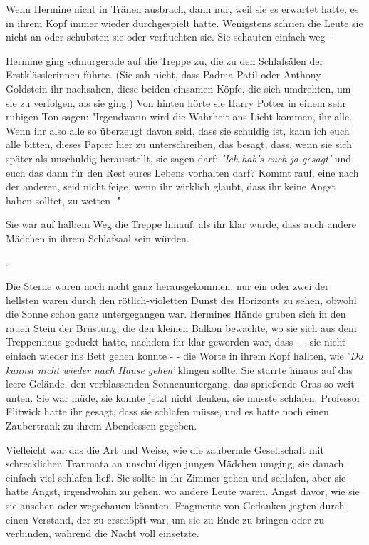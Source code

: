 {Wenn Hermine nicht in Tränen ausbrach, dann nur, weil sie es erwartet hatte, es in ihrem Kopf immer wieder durchgespielt hatte. Wenigstens schrien die Leute sie nicht an oder schubsten sie oder verfluchten sie. Sie schauten einfach weg -

Hermine ging schnurgerade auf die Treppe zu, die zu den Schlafsälen der Erstklässlerinnen führte. (Sie sah nicht, dass Padma Patil oder Anthony Goldstein ihr nachsahen, diese beiden einsamen Köpfe, die sich umdrehten, um sie zu verfolgen, als sie ging.) Von hinten hörte sie Harry Potter in einem sehr ruhigen Ton sagen: "Irgendwann wird die Wahrheit ans Licht kommen, ihr alle. Wenn ihr also alle so überzeugt davon seid, dass sie schuldig ist, kann ich euch alle bitten, dieses Papier hier zu unterschreiben, das besagt, dass, wenn sie sich später als unschuldig herausstellt, sie sagen darf: \emph{'Ich hab's euch ja gesagt'} und euch das dann für den Rest eures Lebens vorhalten darf? Kommt rauf, eine nach der anderen, seid nicht feige, wenn ihr wirklich glaubt, dass ihr keine Angst haben solltet, zu wetten -"

Sie war auf halbem Weg die Treppe hinauf, als ihr klar wurde, dass auch andere Mädchen in ihrem Schlafsaal sein würden.

…

Die Sterne waren noch nicht ganz herausgekommen, nur ein oder zwei der hellsten waren durch den rötlich-violetten Dunst des Horizonts zu sehen, obwohl die Sonne schon ganz untergegangen war. Hermines Hände gruben sich in den rauen Stein der Brüstung, die den kleinen Balkon bewachte, wo sie sich aus dem Treppenhaus geduckt hatte, nachdem ihr klar geworden war, dass - - sie nicht einfach wieder ins Bett gehen konnte - - die Worte in ihrem Kopf hallten, wie '\emph{Du kannst nicht wieder nach Hause gehen'} klingen sollte. Sie starrte hinaus auf das leere Gelände, den verblassenden Sonnenuntergang, das sprießende Gras so weit unten. Sie war müde, sie konnte jetzt nicht denken, sie musste schlafen. Professor Flitwick hatte ihr gesagt, dass sie schlafen müsse, und es hatte noch einen Zaubertrank zu ihrem Abendessen gegeben.

Vielleicht war das die Art und Weise, wie die zaubernde Gesellschaft mit schrecklichen Traumata an unschuldigen jungen Mädchen umging, sie danach einfach viel schlafen ließ. Sie sollte in ihr Zimmer gehen und schlafen, aber sie hatte Angst, irgendwohin zu gehen, wo andere Leute waren. Angst davor, wie sie sie ansehen oder wegschauen könnten. Fragmente von Gedanken jagten durch einen Verstand, der zu erschöpft war, um sie zu Ende zu bringen oder zu verbinden, während die Nacht voll einsetzte.

}
